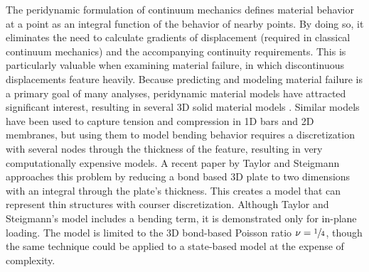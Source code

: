 \documentclass[preprint,review,12pt]{elsarticle}
\begin{document}
The peridynamic formulation of continuum mechanics defines material behavior at a point as an integral function of the behavior of nearby points. By doing so, it eliminates the need to calculate gradients of displacement (required in classical continuum mechanics) and the accompanying continuity requirements. This is particularly valuable when examining material failure, in which discontinuous displacements feature heavily. Because predicting and modeling material failure is a primary goal of many analyses, peridynamic material models have attracted significant interest, resulting in several 3D solid material models \cite{silling2007peridynamic, silling2005meshfree, gerstle2007peridynamic}. Similar models have been used to capture tension and compression in 1D bars\cite{silling2003deformation} and 2D membranes\cite{silling2005peridynamic}, but using them to model bending behavior requires a discretization with several nodes through the thickness of the feature, resulting in very computationally expensive models. A recent paper by Taylor and Steigmann \cite{taylor2013two} approaches this problem by reducing a bond based 3D plate to two dimensions with an integral through the plate's thickness.  This creates a model that can represent thin structures with courser discretization. Although Taylor and Steigmann's model includes a bending term, it is demonstrated only for in-plane loading. The model is limited to the 3D bond-based Poisson ratio \(\nu=\sfrac{1}{4}\), though the same technique could be applied to a state-based model at the expense of complexity.
\end{document}
